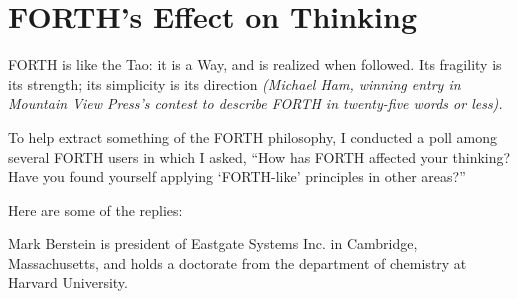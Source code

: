 \epilog{}
\chapter{
FORTH's Effect
on Thinking}
\begin{tfquot}
FORTH is like the Tao: it is a Way, and is realized when followed.  Its
fragility is its strength; its simplicity is its direction {\em (Michael Ham,
winning entry in Mountain View Press's contest to describe FORTH in twenty-five 
words or less).}
\end{tfquot}

To help extract something of the FORTH philosophy, I conducted a poll
among several FORTH users in which I asked, ``How has FORTH affected
your thinking?  Have you found yourself applying `FORTH-like' 
principles in other areas?''

Here are some of the replies:

Mark Berstein is president of Eastgate Systems Inc. in Cambridge, 
Massachusetts, and holds a doctorate from the department of 
chemistry at Harvard University.

